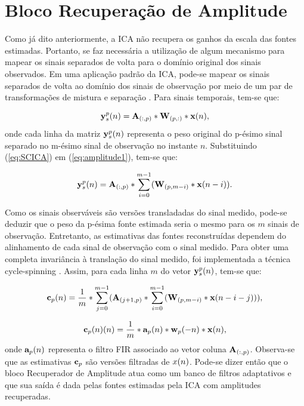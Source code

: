 \documentclass[a4paper,12pt]{monografia}
\theoremstyle{plain}
\theoremstyle{definition}
\theoremstyle{remark}
\begin{document}
\section{Bloco Recuperação de Amplitude}

Como já dito anteriormente, a ICA não recupera os ganhos da escala das fontes estimadas. Portanto, se faz necessária a utilização de algum mecanismo para mapear os sinais separados de volta para o domínio original dos sinais observados.
Em uma aplicação padrão da ICA, pode-se mapear os sinais separados de volta ao domínio dos sinais de observação por meio de um par de transformações de mistura e separação \cite{davies2007source}. Para sinais temporais, tem-se que:

\begin{equation}
    {\bf y}_{s}^{p}(n)= {\bf A}_{(:,p)}*{\bf W}_{(p,:)}*{\bf x}(n),
    \label{eq:amplitude1}
\end{equation}
onde cada linha da matriz \textbf{${\bf y}_{s}^{p}(n)$} representa o peso original do p-ésimo sinal separado no m-ésimo sinal de observação no instante $n$. Substituindo (\ref{eq:SCICA}) em (\ref{eq:amplitude1}), tem-se que:

\begin{equation}
    {\bf y}_{s}^{p}(n)= {\bf A}_{(:,p)}*\sum_{i=0}^{m-1}({\bf W}_{(p,m-i)}*{\bf x}(n-i)).
    \label{eq:amplitude2}
\end{equation}

Como os sinais observáveis são versões transladadas do sinal medido, pode-se deduzir que o peso da p-ésima fonte estimada seria o mesmo para os $m$ sinais de observação. Entretanto, as estimativas das fontes reconstruídas dependem do alinhamento de cada sinal de observação com o sinal medido. Para obter uma completa invariância à translação do sinal medido, foi implementada a técnica cycle-spinning \cite{coifman1995translation}. Assim, para cada linha $m$ do vetor ${\bf y}_{s}^{p}(n)$, tem-se que:

\begin{equation}
    {\bf c}_{p}(n)= \frac{1}{m}*\sum_{j=0}^{m-1} ({\bf A}_{(j+1,p)}*\sum_{i=0}^{m-1}({\bf W}_{(p,m-i)}*{\bf x}(n-i-j))),
    \label{eq:amplitude3}
\end{equation}

\begin{equation}
    {\bf c}_{p}(n)(n)= \frac{1}{m}*{\bf a}_{p}(n)*{\bf w}_{p}(-n)*{\bf x}(n),
    \label{eq:amplitude4}
\end{equation}
onde ${\bf a}_{p}(n)$ representa o filtro FIR associado ao vetor coluna ${\bf A}_{(:,p)}$. Observa-se que as estimativas ${\bf c}_{p}$ são versões filtradas de ${\bf }x(n)$. Pode-se dizer então que o bloco Recuperador de Amplitude atua como um banco de filtros adaptativos e que sua saída é dada pelas fontes estimadas pela ICA com amplitudes recuperadas. 
\end{document}
